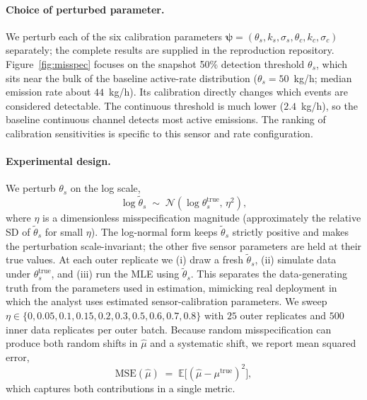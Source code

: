 \documentclass[11pt]{article}
\newcommand{\new}[1]{#1}
\begin{document}
\paragraph{Choice of perturbed parameter.}
\new{We perturb each of the six calibration parameters $\boldsymbol\psi=(\theta_s,k_s,\sigma_s,\theta_c,k_c,\sigma_c)$ separately; the complete results are supplied in the reproduction repository. Figure~\ref{fig:misspec} focuses on the snapshot 50\% detection threshold $\theta_s$, which sits near the bulk of the baseline active-rate distribution ($\theta_s=50$~kg/h; median emission rate about $44$~kg/h). Its calibration directly changes which events are considered detectable. The continuous threshold is much lower ($2.4$~kg/h), so the baseline continuous channel detects most active emissions. The ranking of calibration sensitivities is specific to this sensor and rate configuration.}

\paragraph{Experimental design.}
\new{We perturb $\theta_s$ on the log scale,
\begin{equation}
    \log \tilde\theta_s \;\sim\; \mathcal{N}(\log \theta_s^{\text{true}},\, \eta^2),
\end{equation}
where $\eta$ is a dimensionless misspecification magnitude
(approximately the relative SD of $\tilde\theta_s$ for small $\eta$). The
log-normal form keeps $\tilde\theta_s$ strictly positive and makes the
perturbation scale-invariant; the other five sensor parameters are held
at their true values. At each outer replicate we (i) draw a fresh
$\tilde\theta_s$, (ii) simulate data under $\theta_s^{\text{true}}$, and
(iii) run the MLE using $\tilde\theta_s$. This separates the data-generating
truth from the parameters used in estimation, mimicking real deployment in
which the analyst uses estimated sensor-calibration parameters. We sweep $\eta \in \{0, 0.05, 0.1, 0.15, 0.2, 0.3, 0.5, 0.6, 0.7, 0.8\}$
with $25$ outer replicates and $500$ inner data replicates per outer
batch. Because random misspecification can produce both random shifts in
$\hat\mu$ and a systematic shift,
we report mean squared error,
\begin{equation}
    \mathrm{MSE}(\hat\mu) \;=\; \mathbb{E}\!\bigl[(\hat\mu - \mu^{\text{true}})^2\bigr],
\end{equation}
which captures both contributions in a single metric.}
\end{document}
